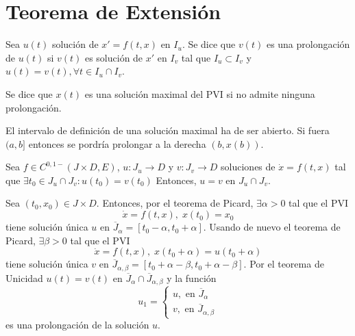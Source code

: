 \section{Teorema de Extensión}

\begin{defn}[Prolongación]
  Sea $u(t)$ solución de $x' = f(t,x)$ en $I_{u}$. Se dice que $ v(t)$ es una prolongación de $u(t)$ si $v(t)$ es solución de $x'$ en $I_{v}$ tal que $I_{u} \subset I_{v}$ y $u(t) = v(t), \forall t \in I_{u} \cap I_{v}$.
\end{defn}

\begin{defn}
  Se dice que $x(t)$ es una solución maximal del PVI si no admite ninguna prolongación.
\end{defn}

\begin{obs}
  El intervalo de definición de una solución maximal ha de ser abierto. Si fuera $(a, b]$ entonces se pordría prolongar a la derecha $(b, x(b))$.
\end{obs}

\begin{theo}
  Sea $f \in C^{0,1-}(J \times D, E)$, $u: J_{u} \to D$ y $v: J_{v} \to D$ soluciones de $\dot{x} = f(t, x)$ tal que $\exists t_{0} \in J_{u} \cap J_{v}: u(t_{0}) = v(t_{0})$ Entonces, $u = v$ en $ J_{u} \cap J_{v}$.
\end{theo}

\begin{ejm}
  Sea $(t_{0}, x_{0}) \in J \times D$. Entonces, por el teorema de Picard, $\exists \alpha >0$ tal que el PVI
  \[ 
    \dot{x} = f(t, x), \; x(t_{0}) = x_{0}  
  \] 
  tiene solución única $u$ en $\overline{J}_{\alpha} = [t_{0} - \alpha, t_{0} + \alpha]$. Usando de nuevo el teorema de Picard, $\exists \beta >0$ tal que el PVI
  \[ 
    \dot{x} = f(t,x), \; x(t_{0} + \alpha) = u(t_{0} + \alpha) 
  \] 
tiene solución única $v$ en $\overline{J}_{\alpha, \beta} = [t_{0} + \alpha - \beta, t_{0} + \alpha - \beta]$. Por el teorema de Unicidad $u(t) = v(t)$ en $\overline{J}_{\alpha} \cap \overline{J}_{\alpha, \beta}$ y la función
  \[ 
    u_{1}  =
    \begin{cases}
      u, \text{ en } \overline{J}_{\alpha} \\
      v, \text{ en } \overline{J}_{\alpha, \beta}
    \end{cases} 
  \] 
  es una prolongación de la solución $u$.
\end{ejm}
